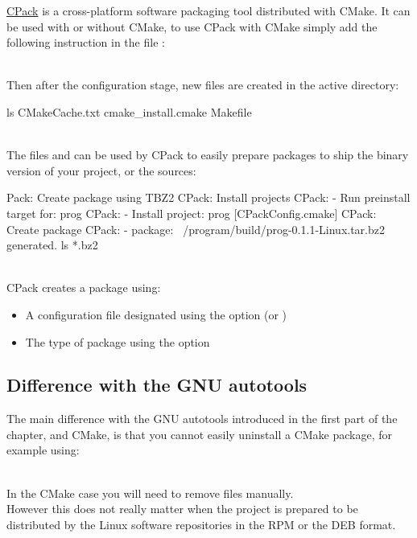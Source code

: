 \href{https://cmake.org/cmake/help/book/mastering-cmake/chapter/Packaging\%20With\%20CPack.html}{CPack} is a cross-platform software packaging tool distributed with CMake. 
It can be used with or without CMake, to use CPack with CMake simply add the following instruction in the file :
\begin{script}
\end{script}
\\[-0.5cm]
\noindent Then after the configuration stage, new files are created in the active directory: 
\begin{script}
 ls 
CMakeCache.txt                         cmake\_install.cmake  
    Makefile
\end{script}\\[-0.5cm]
The files  and  can be used by CPack to easily prepare packages to ship the binary version of your project, or the sources: 
\begin{script}
     
Pack: Create package using TBZ2
CPack: Install projects
CPack: - Run preinstall target for: prog
CPack: - Install project: prog [CPackConfig.cmake]
CPack: Create package
CPack: - package: ~/program/build/prog-0.1.1-Linux.tar.bz2 generated.
 ls *.bz2
\end{script}
\\[-0.5cm]
CPack creates a package using: 
\begin{itemize}
\item A configuration file designated using the option  (or )
\item The type of package using the option 
\end{itemize}

\subsection{Difference with the GNU autotools}

The main difference with the GNU autotools introduced in the first part of the chapter, and CMake, 
is that you cannot easily uninstall a CMake package, for example using: 
\begin{script}
   
\end{script}
\\[-0.5cm]
In the CMake case you will need to remove files manually. \\[0.25cm]
However this does not really matter when the project is prepared to be distributed by the Linux software repositories in the RPM or the DEB format. 

